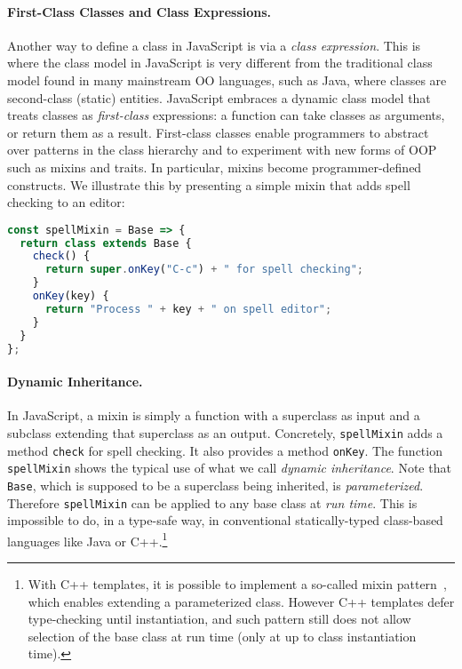 \paragraph{First-Class Classes and Class Expressions.}

Another way to define a class in JavaScript is via a \emph{class expression}. This is where the class
model in JavaScript is very different from the traditional class model found in
many mainstream OO languages, such as Java, where classes are second-class
(static) entities. JavaScript embraces a dynamic class model that treats classes
as \emph{first-class} expressions: a function can take classes as arguments,
or return them as a result. First-class classes enable programmers to
abstract over patterns in the class hierarchy and to experiment with new forms of OOP
such as mixins and traits. In particular, mixins become programmer-defined
constructs. We illustrate this by presenting a simple mixin that adds
spell checking to an editor:
\begin{lstlisting}[language=JavaScript]
const spellMixin = Base => {
  return class extends Base {
    check() {
      return super.onKey("C-c") + " for spell checking";
    }
    onKey(key) {
      return "Process " + key + " on spell editor";
    }
  }
};
\end{lstlisting}

\paragraph{Dynamic Inheritance.}

In JavaScript, a mixin is simply a function with a superclass as input and a
subclass extending that superclass as an output. Concretely, \lstinline{spellMixin}
adds a method \lstinline{check} for spell checking. It also provides
a method \lstinline{onKey}.
The function \lstinline{spellMixin} shows the typical use of what we call \emph{dynamic inheritance}.
Note that \lstinline{Base}, which is supposed to be a superclass being inherited, is \emph{parameterized}.
Therefore \lstinline{spellMixin} can be applied to any base class at
\emph{run time}. This is impossible to do, in a type-safe way, in
conventional statically-typed class-based languages like Java or
C++.\footnote{With C++ templates, it is possible to
  implement a so-called mixin pattern~\citep{DBLP:conf/gcse/SmaragdakisB00}, which enables extending
a parameterized class. However C++ templates defer type-checking until
instantiation, and such pattern still does not allow selection of the
base class at run time (only at up to class instantiation time).}

